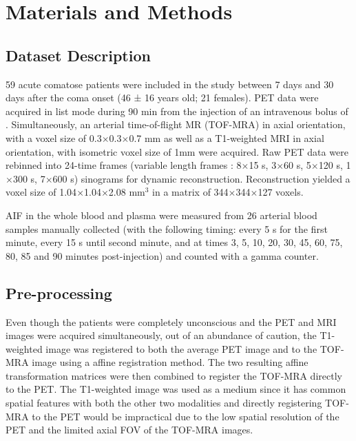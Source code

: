 \chapter{Materials and Methods}

\section{Dataset Description}
59 acute comatose patients were included in the study between 7 days and 30 days after the coma onset (46 ± 16 years old; 21 females).
PET data were acquired in list mode during 90 min from the injection of an intravenous bolus of \fdg.
Simultaneously, an arterial time-of-flight MR (TOF-MRA)  in axial orientation, with a voxel size of 0.3$\times$0.3$\times$0.7 mm as well as a T1-weighted MRI in axial orientation, with isometric voxel size of 1mm were acquired.
Raw PET data were rebinned into 24-time frames (variable length frames : 8$\times$15 s, 3$\times$60 s, 5$\times$120 s, 1$\times$300 s, 7$\times$600 s) sinograms for dynamic reconstruction.
Reconstruction yielded a voxel size of 1.04$\times$1.04$\times$2.08 mm$^3$ in a matrix of 344$\times$344$\times$127 voxels.

AIF in the whole blood and plasma were measured from 26 arterial blood samples manually collected (with the following timing: every 5 s for the first minute, every 15 s until second minute, and at times 3, 5, 10, 20, 30, 45, 60, 75, 80, 85 and 90 minutes post-injection) and counted with a gamma counter.

\section{Pre-processing}
Even though the patients were completely unconscious and the PET and MRI images were acquired simultaneously, out of an abundance of caution, the T1-weighted image was registered to both the average PET image and to the TOF-MRA image using a affine registration method.
The two resulting affine transformation matrices were then combined to register the TOF-MRA directly to the PET.
The T1-weighted image was used as a medium since it has common spatial features with both the other two modalities and directly registering TOF-MRA to the PET would be impractical due to the low spatial resolution of the PET and the limited axial FOV of the TOF-MRA images.

